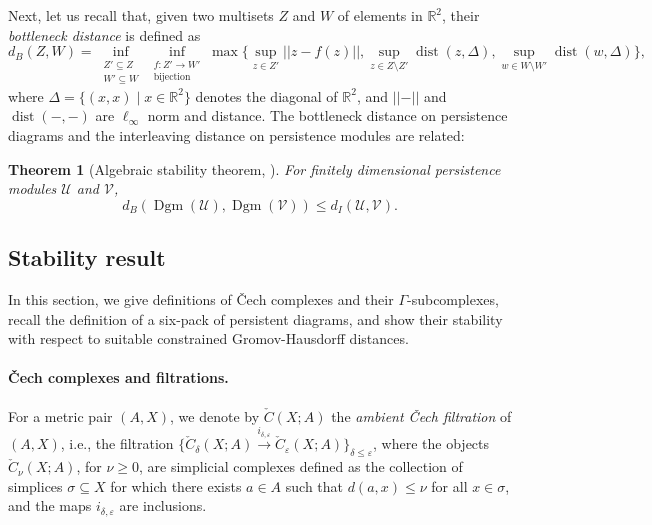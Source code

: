 \documentclass[8pt,a4paper,oneside,english,english]{article}
\theoremstyle{plain}
\theoremstyle
{plain}
\newtheorem{theorem}{Theorem}[section]
\theoremstyle{definition}
\newcommand{\R}{\mathbb{R}}
\newcommand{\dint}{d_I}
\DeclareMathOperator{\dist}{dist}
\DeclareMathOperator{\Dgm}{Dgm}
\begin{document}
Next, let us recall that, given two multisets $Z$ and $W$ of elements in $\R^2$, their {\em bottleneck distance} is defined as
\[
    d_B(Z,W)=\inf_{\substack{Z'\subseteq Z\\W'\subseteq W}}\inf_{\substack{f\colon Z'\to W'\\\text{bijection}}}\max\{\sup_{z\in Z'}\lvert\lvert z-f(z)\rvert\rvert,\sup_{z\in Z\setminus Z'}\dist(z,\Delta),\sup_{w\in W\setminus W'}\dist(w,\Delta)\},
\]
where $\Delta=\{(x,x)\mid x\in\R^2\}$ denotes the diagonal of $\R^2$, and $\lvert\lvert-\rvert\rvert$ and $\dist(-,-)$
are $\ell_\infty$ norm and distance. The bottleneck distance on persistence diagrams and the interleaving distance on persistence modules are related:

\begin{theorem}[Algebraic stability theorem, \cite{ChaCoh-SteGliGuiOud}]\label{thm:algebraic_stability_theorem}
    For finitely dimensional persistence modules $\mathcal U$ and $\mathcal V$,
    \[
        d_B(\Dgm(\mathcal U),\Dgm(\mathcal V))\leq\dint(\mathcal{U}, \mathcal{V}).
    \]
\end{theorem}

\subsection{Stability result}\label{sub:stability}

In this section, we give definitions of \v{C}ech complexes and their $\Gamma$-subcomplexes, recall the definition of a six-pack of persistent diagrams, and show their stability with respect to suitable constrained Gromov-Hausdorff distances.

\paragraph{\v{Cech} complexes and filtrations.} For a metric pair $(A,X)$, we denote by $\check{C}(X;A)$ the {\em ambient \v{C}ech filtration} of $(A,X)$, i.e., the filtration $\{\check{C}_\delta(X;A)\xrightarrow{i_{\delta,\varepsilon}}\check{C}_\varepsilon(X;A)\}_{\delta\leq\varepsilon}$,
where the objects $\check{C}_\nu(X;A)$, for $\nu\geq 0$, are simplicial complexes defined as the collection of simplices $\sigma\subseteq X$ for which there exists $a\in A$ such that $d(a,x)\leq \nu$ for all $x\in\sigma$, and the maps $i_{\delta,\varepsilon}$ are inclusions.
\end{document}
